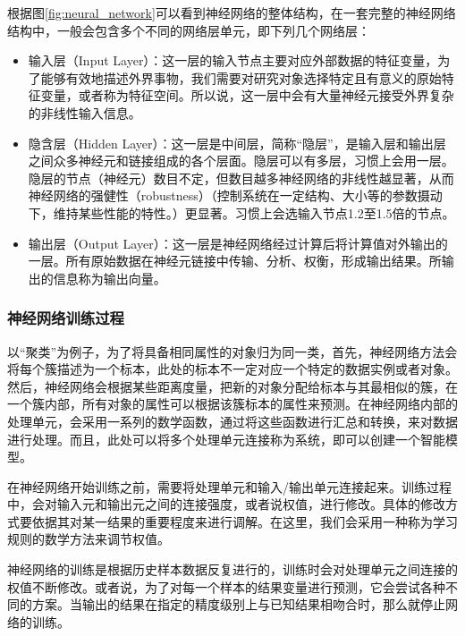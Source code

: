 根据图\ref{fig:neural_network}可以看到神经网络的整体结构，在一套完整的神经网络结构中，一般会包含多个不同的网络层单元，即下列几个网络层：
\begin{itemize}[noitemsep,topsep=0pt,parsep=0pt,partopsep=0pt]
	\item 输入层（Input Layer）：这一层的输入节点主要对应外部数据的特征变量，为了能够有效地描述外界事物，我们需要对研究对象选择特定且有意义的原始特征变量，或者称为特征空间。所以说，这一层中会有大量神经元接受外界复杂的非线性输入信息。
	\item 隐含层（Hidden Layer）：这一层是中间层，简称“隐层”，是输入层和输出层之间众多神经元和链接组成的各个层面。隐层可以有多层，习惯上会用一层。隐层的节点（神经元）数目不定，但数目越多神经网络的非线性越显著，从而神经网络的强健性（robustness）（控制系统在一定结构、大小等的参数摄动下，维持某些性能的特性。）更显著。习惯上会选输入节点1.2至1.5倍的节点。
	\item 输出层（Output Layer）：这一层是神经网络经过计算后将计算值对外输出的一层。所有原始数据在神经元链接中传输、分析、权衡，形成输出结果。所输出的信息称为输出向量。
\end{itemize}

\subsubsection{神经网络训练过程}
以“聚类”为例子，为了将具备相同属性的对象归为同一类，首先，神经网络方法会将每个簇描述为一个标本，此处的标本不一定对应一个特定的数据实例或者对象。然后，神经网络会根据某些距离度量，把新的对象分配给标本与其最相似的簇，在一个簇内部，所有对象的属性可以根据该簇标本的属性来预测。在神经网络内部的处理单元，会采用一系列的数学函数，通过将这些函数进行汇总和转换，来对数据进行处理。而且，此处可以将多个处理单元连接称为系统，即可以创建一个智能模型。

在神经网络开始训练之前，需要将处理单元和输入/输出单元连接起来。训练过程中，会对输入元和输出元之间的连接强度，或者说权值，进行修改。具体的修改方式要依据其对某一结果的重要程度来进行调解。在这里，我们会采用一种称为学习规则的数学方法来调节权值。

神经网络的训练是根据历史样本数据反复进行的，训练时会对处理单元之间连接的权值不断修改。或者说，为了对每一个样本的结果变量进行预测，它会尝试各种不同的方案。当输出的结果在指定的精度级别上与已知结果相吻合时，那么就停止网络的训练。

